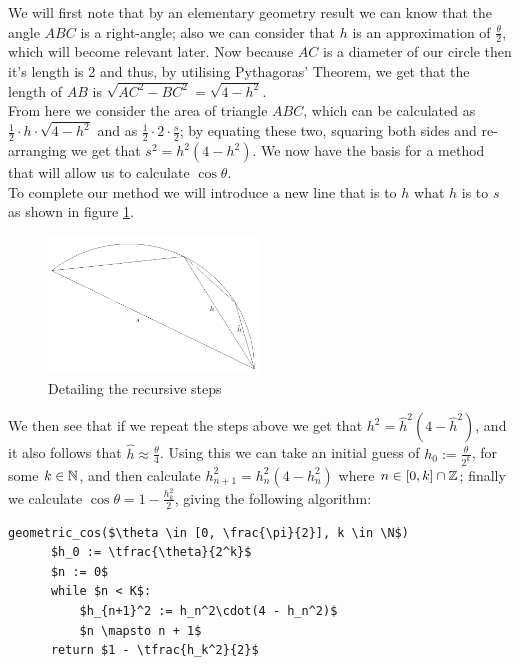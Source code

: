 We will first note that by an elementary geometry result we can know that the angle \(ABC\) is a right-angle; also we can consider that \(h\) is an approximation of \(\tfrac{\theta}{2}\), which will become relevant later. Now because \(AC\) is a diameter of our circle then it's length is 2 and thus, by utilising Pythagoras' Theorem, we get that the length of \(AB\) is \(\sqrt{AC^2 - BC^2} = \sqrt{4 - h^2}\).\\

From here we consider the area of triangle \(ABC\), which can be calculated as \(\frac{1}{2}\cdot h\cdot\sqrt{4-h^2}\) and as \(\frac{1}{2}\cdot2\cdot\frac{s}{2}\); by equating these two, squaring both sides and re-arranging we get that \(s^2 = h^2(4 - h^2)\). We now have the basis for a method that will allow us to calculate \(\cos\theta\).\\

To complete our method we will introduce a new line that is to \(h\) what \(h\) is to \(s\) as shown in figure \ref{FIG_"Geometric Trig 3"}.

\begin{figure}[!ht]
	\caption{Detailing the recursive steps}
	\label{FIG_"Geometric Trig 3"}
	\centering
	\includegraphics[width=0.5\textwidth]{"./Diagrams/Geometric Trig Diagram 3"}
\end{figure}

We then see that if we repeat the steps above we get that \(h^2 = \hat{h}^2(4 - \hat{h}^2)\), and it also follows that \(\hat{h} \approx \frac{\theta}{4}\). Using this we can take an initial guess of \(h_0 := \frac{\theta}{2^k}\), for some \(k \in \mathbb{N}\), and then calculate \(h_{n+1}^2 = h_n^2(4 - h_n^2)\) where \(n \in [0, k] \cap \mathbb{Z}\); finally we calculate \(\cos\theta = 1 - \frac{h_k^2}{2}\), giving the following algorithm:
  
\begin{lstlisting}[caption={Geometric calculation of \(\cos\)},label={PCD_"Geometric Cos"}]
  geometric_cos($\theta \in [0, \frac{\pi}{2}], k \in \N$)
      $h_0 := \tfrac{\theta}{2^k}$
      $n := 0$
      while $n < K$:
          $h_{n+1}^2 := h_n^2\cdot(4 - h_n^2)$
          $n \mapsto n + 1$
      return $1 - \tfrac{h_k^2}{2}$
\end{lstlisting}\\

